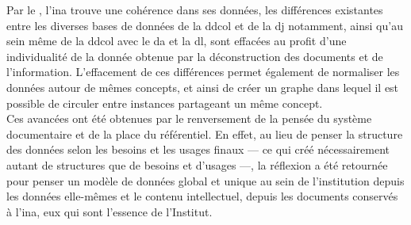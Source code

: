 Par le \ldd, l'\ac{ina} trouve une cohérence dans ses données, les différences existantes entre les diverses bases de données de la \ac{ddcol} et de la \ac{dj} notamment, ainsi qu'au sein même de la \ac{ddcol} avec le \ac{da} et la \ac{dl}, sont effacées au profit d'une individualité de la donnée obtenue par la déconstruction des documents et de l'information. L'effacement de ces différences permet également de normaliser les données autour de mêmes concepts, et ainsi de créer un graphe dans lequel il est possible de circuler entre instances partageant un même concept.\\

Ces avancées ont été obtenues par le renversement de la pensée du système documentaire et de la place du référentiel. En effet, au lieu de penser la structure des données selon les besoins et les usages finaux --- ce qui créé nécessairement autant de structures que de besoins et d'usages ---, la réflexion a été retournée pour penser un modèle de données global et unique au sein de l'institution depuis les données elle-mêmes et le contenu intellectuel, depuis les documents conservés à l'\ac{ina}, eux qui sont l'essence de l'Institut.